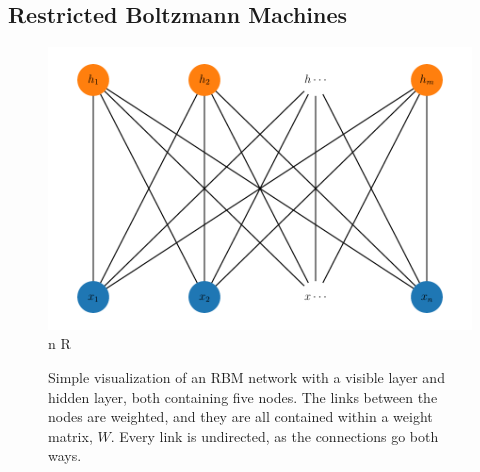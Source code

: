 \subsection{Restricted Boltzmann Machines}



\begin{figure}[H]
\begin{center}\includegraphics[scale=0.5]{latex/latex-report/Images/rbm_visualize.pdf}n
R\end{center}
\caption{Simple visualization of an RBM network with a visible layer and hidden layer, both containing five nodes. The links between the nodes are weighted, and they are all contained within a weight matrix, $W$. Every link is undirected, as the connections go both ways.}
\label{fig:vis_BM}
\end{figure}





